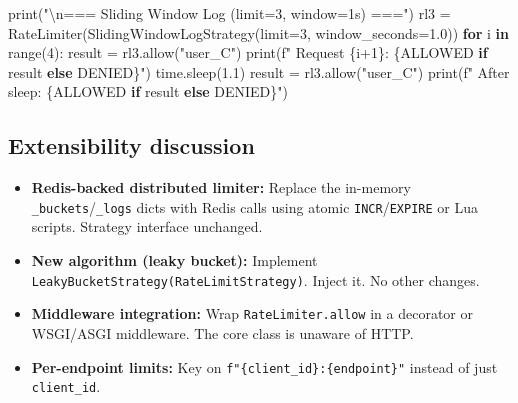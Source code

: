 \documentclass[11pt]{article}
\providecommand{\tightlist}{\setlength{\itemsep}{1pt}\setlength{\parskip}{0pt}}
\newenvironment{Shaded}{\begin{snugshade}}{\end{snugshade}}
\newcommand{\BuiltInTok}[1]{\textcolor[rgb]{0.50,0.55,0.55}{#1}}
\newcommand{\CharTok}[1]{\textcolor[rgb]{0.24,0.68,0.91}{#1}}
\newcommand{\ControlFlowTok}[1]{\textcolor[rgb]{0.99,0.74,0.29}{\textbf{#1}}}
\newcommand{\DecValTok}[1]{\textcolor[rgb]{0.96,0.45,0.00}{#1}}
\newcommand{\FloatTok}[1]{\textcolor[rgb]{0.96,0.45,0.00}{#1}}
\newcommand{\KeywordTok}[1]{\textcolor[rgb]{0.81,0.81,0.76}{\textbf{#1}}}
\newcommand{\NormalTok}[1]{\textcolor[rgb]{0.81,0.81,0.76}{#1}}
\newcommand{\OperatorTok}[1]{\textcolor[rgb]{0.81,0.81,0.76}{#1}}
\newcommand{\SpecialCharTok}[1]{\textcolor[rgb]{0.24,0.68,0.91}{#1}}
\newcommand{\SpecialStringTok}[1]{\textcolor[rgb]{0.85,0.27,0.33}{#1}}
\newcommand{\StringTok}[1]{\textcolor[rgb]{0.96,0.31,0.31}{#1}}
\begin{document}
\begin{Shaded}
\begin{Highlighting}[]
    \BuiltInTok{print}\NormalTok{(}\StringTok{"}\CharTok{\textbackslash{}n}\StringTok{=== Sliding Window Log (limit=3, window=1s) ==="}\NormalTok{)}
\NormalTok{    rl3 }\OperatorTok{=}\NormalTok{ RateLimiter(SlidingWindowLogStrategy(limit}\OperatorTok{=}\DecValTok{3}\NormalTok{, window\_seconds}\OperatorTok{=}\FloatTok{1.0}\NormalTok{))}
    \ControlFlowTok{for}\NormalTok{ i }\KeywordTok{in} \BuiltInTok{range}\NormalTok{(}\DecValTok{4}\NormalTok{):}
\NormalTok{        result }\OperatorTok{=}\NormalTok{ rl3.allow(}\StringTok{"user\_C"}\NormalTok{)}
        \BuiltInTok{print}\NormalTok{(}\SpecialStringTok{f"  Request }\SpecialCharTok{\{}\NormalTok{i}\OperatorTok{+}\DecValTok{1}\SpecialCharTok{\}}\SpecialStringTok{: }\SpecialCharTok{\{}\StringTok{\textquotesingle{}ALLOWED\textquotesingle{}} \ControlFlowTok{if}\NormalTok{ result }\ControlFlowTok{else} \StringTok{\textquotesingle{}DENIED\textquotesingle{}}\SpecialCharTok{\}}\SpecialStringTok{"}\NormalTok{)}
\NormalTok{    time.sleep(}\FloatTok{1.1}\NormalTok{)}
\NormalTok{    result }\OperatorTok{=}\NormalTok{ rl3.allow(}\StringTok{"user\_C"}\NormalTok{)}
    \BuiltInTok{print}\NormalTok{(}\SpecialStringTok{f"  After sleep: }\SpecialCharTok{\{}\StringTok{\textquotesingle{}ALLOWED\textquotesingle{}} \ControlFlowTok{if}\NormalTok{ result }\ControlFlowTok{else} \StringTok{\textquotesingle{}DENIED\textquotesingle{}}\SpecialCharTok{\}}\SpecialStringTok{"}\NormalTok{)}
\end{Highlighting}
\end{Shaded}

\subsection{Extensibility discussion}\label{extensibility-discussion-2}

\begin{itemize}
\tightlist
\item
  \textbf{Redis-backed distributed limiter:} Replace the in-memory \texttt{\_buckets}/\texttt{\_logs} dicts with Redis calls using atomic \texttt{INCR}/\texttt{EXPIRE} or Lua scripts. Strategy interface unchanged.
\item
  \textbf{New algorithm (leaky bucket):} Implement \texttt{LeakyBucketStrategy(RateLimitStrategy)}. Inject it. No other changes.
\item
  \textbf{Middleware integration:} Wrap \texttt{RateLimiter.allow} in a decorator or WSGI/ASGI middleware. The core class is unaware of HTTP.
\item
  \textbf{Per-endpoint limits:} Key on \texttt{f"\{client\_id\}:\{endpoint\}"} instead of just \texttt{client\_id}.
\end{itemize}
\end{document}
